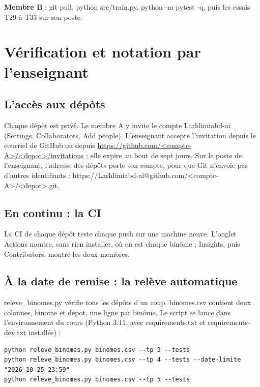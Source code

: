 \documentclass[11pt,a4paper]{article}
\newcommand{\co}[1]{{\ttfamily\hyphenchar\font=45\relax #1}}
\begin{document}
\textbf{Membre B} : \co{git pull}, \co{python src/train.py}, \co{python -m pytest -q}, puis les essais T29 à
T33 sur son poste.

\section{Vérification et notation par l'enseignant}

\subsection{L'accès aux dépôts}

Chaque dépôt est privé. Le membre A y invite le compte \co{Larhlimiabd-ai} (Settings, Collaborators,
Add people). L'enseignant accepte l'invitation depuis le courriel de GitHub ou depuis
\url{https://github.com/<compte-A>/<depot>/invitations} ; elle expire au bout de sept jours. Sur le poste de
l'enseignant, l'adresse des dépôts porte son compte, pour que Git n'envoie pas d'autres identifiants :
\co{https://Larhlimiabd-ai@github.com/<compte-A>/<depot>.git}.

\subsection{En continu : la CI}

La CI de chaque dépôt teste chaque push sur une machine neuve. L'onglet Actions montre, sans rien installer,
où en est chaque binôme ; Insights, puis Contributors, montre les deux membres.

\subsection{À la date de remise : la relève automatique}

\co{releve\_binomes.py} vérifie tous les dépôts d'un coup. \co{binomes.csv} contient deux colonnes,
\co{binome} et \co{depot}, une ligne par binôme. Le script se lance dans l'environnement du cours
(Python 3.11, avec \co{requirements.txt} et \co{requirements-dev.txt} installés) :

\begin{lstlisting}
python releve_binomes.py binomes.csv --tp 3 --tests
python releve_binomes.py binomes.csv --tp 4 --tests --date-limite "2026-10-25 23:59"
python releve_binomes.py binomes.csv --tp 5 --tests
\end{lstlisting}
\end{document}
